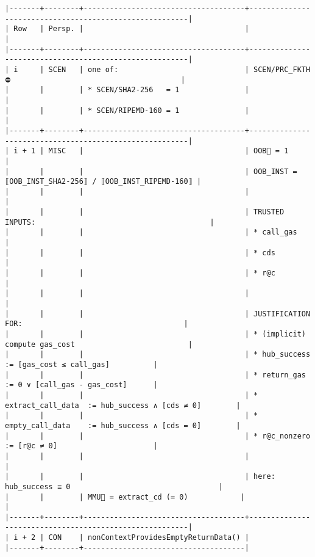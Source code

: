 \documentclass[varwidth=\maxdimen,margin=0.5cm,multi={verbatim}]{standalone}
\begin{document}
\begin{verbatim}
|-------+--------+-------------------------------------+--------------------------------------------------------|
| Row   | Persp. |                                     |                                                        |
|-------+--------+-------------------------------------+--------------------------------------------------------|
| i     | SCEN   | one of:                             | SCEN/PRC_FKTH ⛔                                       |
|       |        | * SCEN/SHA2-256   = 1               |                                                        |
|       |        | * SCEN/RIPEMD-160 = 1               |                                                        |
|-------+--------+-------------------------------------+--------------------------------------------------------|
| i + 1 | MISC   |                                     | OOB🏴 = 1                                              |
|       |        |                                     | OOB_INST = ⟦OOB_INST_SHA2-256⟧ / ⟦OOB_INST_RIPEMD-160⟧ |
|       |        |                                     |                                                        |
|       |        |                                     | TRUSTED INPUTS:                                        |
|       |        |                                     | * call_gas                                             |
|       |        |                                     | * cds                                                  |
|       |        |                                     | * r@c                                                  |
|       |        |                                     |                                                        |
|       |        |                                     | JUSTIFICATION FOR:                                     |
|       |        |                                     | * (implicit) compute gas_cost                          |
|       |        |                                     | * hub_success        := [gas_cost ≤ call_gas]          |
|       |        |                                     | * return_gas         := 0 ∨ [call_gas - gas_cost]      |
|       |        |                                     | * extract_call_data  := hub_success ∧ [cds ≠ 0]        |
|       |        |                                     | * empty_call_data    := hub_success ∧ [cds = 0]        |
|       |        |                                     | * r@c_nonzero        := [r@c ≠ 0]                      |
|       |        |                                     |                                                        |
|       |        |                                     | here: hub_success ≡ 0                                  |
|       |        | MMU🏴 = extract_cd (= 0)            |                                                        |
|-------+--------+-------------------------------------+--------------------------------------------------------|
| i + 2 | CON    | nonContextProvidesEmptyReturnData() |
|-------+--------+-------------------------------------|
\end{verbatim}
\end{document}
